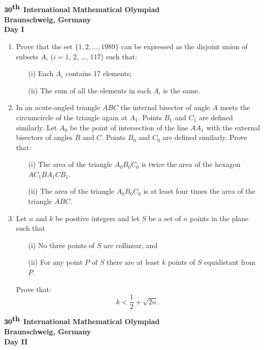 \documentclass[12pt]{article}
\begin{document}
\begin{center}
${\bf 30}^{\mbox{\bf th}}$ {\bf International
Mathematical Olympiad} \\[.1in]
{\bf Braunschweig, Germany} \\ [.05in]
{\bf Day I}\\[.05in]
\end{center}

\vspace*{.3in}

\begin{enumerate}
\item
Prove that the set $\{1, 2, \ldots, 1989\}$ can be expressed as the disjoint
union of subsets $A_i$ ($i = 1$, 2, \ldots, 117) such that:
  \begin{enumerate}
  \item[(i)] Each $A_i$ contains 17 elements;
  \item[(ii)] The sum of all the elements in each $A_i$ is the same.
  \end{enumerate}

\item
In an acute-angled triangle $ABC$ the internal bisector of angle $A$ meets the
circumcircle of the triangle again at $A_1$.  Points $B_1$ and $C_1$ are
defined similarly.  Let $A_0$ be the point of intersection of the line $AA_1$
with the external bisectors of angles $B$ and $C$.  Points $B_0$ and $C_0$ are
defined similarly.  Prove that:
  \begin{enumerate}
  \item[(i)] The area of the triangle $A_0 B_0 C_0$ is twice the area of the
  hexagon $AC_1 BA_1 CB_1$.
  \item[(ii)] The area of the triangle $A_0 B_0 C_0$ is at least four times the
  area of the triangle $ABC$.
  \end{enumerate}

\item
Let $n$ and $k$ be positive integers and let $S$ be a set of $n$ points in the
plane such that
  \begin{enumerate}
  \item[(i)] No three points of $S$ are collinear, and
  \item[(ii)] For any point $P$ of $S$ there are at least $k$ points of $S$
  equidistant from $P$.
  \end{enumerate}
Prove that:
$$k < \frac{1}{2} + \sqrt{2n}.$$
\end{enumerate}

\pagebreak %
\begin{center}
${\bf 30}^{\mbox{\bf th}}$ {\bf International
Mathematical Olympiad} \\[.1in]
{\bf Braunschweig, Germany} \\ [.05in]
{\bf Day II}\\[.05in]
\end{center}
\end{document}
